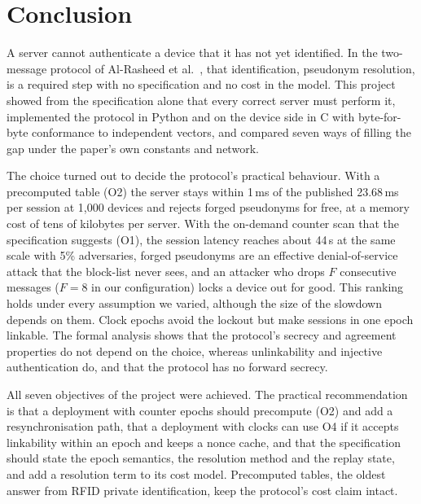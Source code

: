 \section{Conclusion}
A server cannot authenticate a device that it has not yet identified. In the two-message protocol of Al-Rasheed et al.~\cite{base}, that identification, pseudonym resolution, is a required step with no specification and no cost in the model. This project showed from the specification alone that every correct server must perform it, implemented the protocol in Python and on the device side in C with byte-for-byte conformance to independent vectors, and compared seven ways of filling the gap under the paper's own constants and network.

The choice turned out to decide the protocol's practical behaviour. With a precomputed table (O2) the server stays within 1\,ms of the published 23.68\,ms per session at 1,000 devices and rejects forged pseudonyms for free, at a memory cost of tens of kilobytes per server. With the on-demand counter scan that the specification suggests (O1), the session latency reaches about 44\,s at the same scale with 5\% adversaries, forged pseudonyms are an effective denial-of-service attack that the block-list never sees, and an attacker who drops $F$ consecutive messages ($F=8$ in our configuration) locks a device out for good. This ranking holds under every assumption we varied, although the size of the slowdown depends on them. Clock epochs avoid the lockout but make sessions in one epoch linkable. The formal analysis shows that the protocol's secrecy and agreement properties do not depend on the choice, whereas unlinkability and injective authentication do, and that the protocol has no forward secrecy.

All seven objectives of the project were achieved. The practical recommendation is that a deployment with counter epochs should precompute (O2) and add a resynchronisation path, that a deployment with clocks can use O4 if it accepts linkability within an epoch and keeps a nonce cache, and that the specification should state the epoch semantics, the resolution method and the replay state, and add a resolution term to its cost model. Precomputed tables, the oldest answer from RFID private identification, keep the protocol's cost claim intact.

